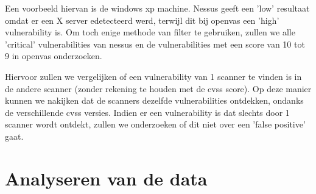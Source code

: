 Een voorbeeld hiervan is de windows xp machine. Nessus geeft een 'low' resultaat omdat er een X server edetecteerd werd, terwijl dit bij openvas een 'high' vulnerability is. Om toch enige methode van filter te gebruiken, zullen we alle 'critical' vulnerabilities van nessus en de vulnerabilities met een score van 10 tot 9 in openvas onderzoeken. 

Hiervoor zullen we vergelijken of een vulnerability van 1 scanner te vinden is in de andere scanner (zonder rekening te houden met de cvss score). Op deze manier kunnen we nakijken dat de scanners dezelfde vulnerabilities ontdekken, ondanks de verschillende cvss versies. Indien er een vulnerability is dat slechts door 1 scanner wordt ontdekt, zullen we onderzoeken of dit niet over een 'false positive' gaat.


\section{Analyseren van de data}

